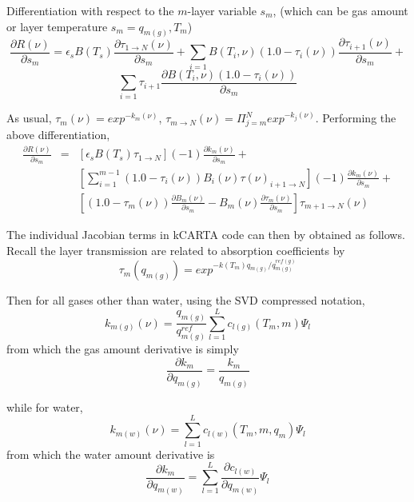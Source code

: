 \documentclass[11pt]{article}
\begin{document}
Differentiation with respect to the $m$-layer variable $s_{m}$, (which can be
gas amount or layer temperature $s_{m} = q_{m(g)},T_{m}$)
\[
\frac{\partial R(\nu)}{\partial s_{m}} = \epsilon_{s}B(T_{s}) 
\frac{\partial \tau_{1 \rightarrow N}(\nu)}{\partial s_{m}} +
\sum_{i=1} B(T_{i},\nu) (1.0 - \tau_{i}(\nu))
\frac{\partial \tau_{i+1}(\nu)}{\partial s_{m}} + 
\]
\begin{equation}
\sum_{i=1} \tau_{i+1}\frac{\partial B(T_{i},\nu) (1.0 - \tau_{i}(\nu))}
{\partial s_{m}}
\end{equation}

As usual, $\tau_{m}(\nu) = exp^{-k_{m}(\nu)}$,
$\tau_{m \rightarrow N}(\nu) = \Pi_{j=m}^{N} exp^{-k_{j}(\nu)}$. Performing the
above differentiation,  
\begin{eqnarray*}
\frac{\partial R(\nu)}{\partial s_{m}} & = &
\left[
\epsilon_{s}B(T_{s}) \tau_{1 \rightarrow N} \right]
(-1)\frac{\partial k_{m}(\nu)}{\partial s_{m}} + \\
& & \left[ \sum_{i=1}^{m-1}(1.0 - \tau_{i}(\nu)) B_{i}(\nu) 
\tau(\nu)_{i+1 \rightarrow N}
\right](-1)\frac{\partial k_{m}(\nu)}{\partial s_{m}} + \\  
& & \left[(1.0-\tau_{m}(\nu))\frac{\partial B_{m}(\nu)}{\partial s_{m}} -
B_{m}(\nu)\frac{\partial \tau_{m}(\nu)}{\partial s_{m}}
\right]\tau_{m+1 \rightarrow N}(\nu)
\end{eqnarray*}

The individual Jacobian terms in \textsf{kCARTA} code can then by
obtained as follows. Recall the layer transmission are related to
absorption coefficients by
\begin{equation}
\tau_{m}(q_{m(g)}) = exp^{-k(T_{m})q_{m(g)}/q^{ref(g)}_{m(g)}}
\end{equation}

Then for all gases other than water, using the SVD compressed notation,
\begin{equation}
k_{m(g)}(\nu) = \frac{q_{m(g)}}{q^{ref}_{m(g)}}
                \sum_{l=1}^{L} c_{l(g)}(T_{m},m) \Psi_{l}
\end{equation}
from which the gas amount derivative is simply 
\begin{equation}
\frac{\partial k_{m}}{\partial q_{m(g)}} = \frac{k_{m}}{q_{m(g)}}
\end{equation}

while for water, 
\begin{equation}
k_{m(w)}(\nu) = \sum_{l=1}^{L} c_{l(w)}(T_{m},m,q_{m}) \Psi_{l}
\end{equation}
from which the water amount derivative is 
\begin{equation}
\frac{\partial k_{m}}{\partial q_{m(w)}} = 
\sum_{l=1}^{L} \frac{\partial c_{l(w)}}{\partial q_{m(w)}} \Psi_{l}
\end{equation}
\end{document}
